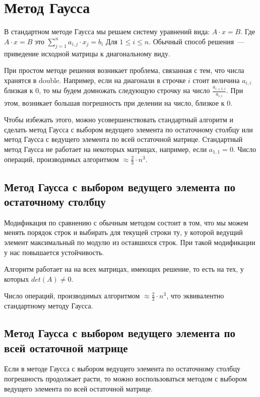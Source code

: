 \documentclass[../../report.tex]{subfiles}
\begin{document}


\chapter{Метод Гаусса}

В стандартном методе Гаусса мы решаем систему уравнений вида: $A \cdot x = B$.
Где $A \cdot x = B$ это
$\sum \limits_{j = 1}^{n} a_{i,j} \cdot x_j = b_i$ Для $1 \le i \le n$.
Обычный способ решения~--- приведение исходной матрицы к диагональному виду.

При простом методе решения возникает проблема, связанная с тем, что числа хранятся в double. Например, если на диагонали в строчке $i$ стоит величина $a_{i,i}$ близкая к $0$, то мы будем домножать следующую строчку на число $\frac{a_{i+1,i}}{a_{i,i}}$. При этом, возникает большая погрешность при делении на число, близкое к $0$.

Чтобы избежать этого, можно усовершенствовать стандартный алгоритм и сделать метод Гаусса с выбором ведущего элемента по остаточному столбцу или метод Гаусса с ведущего элемента по всей остаточной матрице.
Стандартный метод Гаусса не работает на некоторых матрицах, например, если $a_{1,1} = 0$.
Число операций, производимых алгоритмом $\approx \frac{2}{3} \cdot n^3$.

\section{Метод Гаусса с выбором ведущего элемента по остаточному столбцу}
Модификация по сравнению с обычным методом состоит в том, что мы можем менять порядок строк и выбирать для текущей строки ту, у которой ведущий элемент максимальный по модулю из оставшихся строк.
При такой модификации у нас повышается устойчивость.

Алгоритм работает на на всех матрицах, имеющих решение, то есть на тех, у которых $det(A) \neq 0$.

Число операций, производимых алгоритмом $\approx \frac{2}{3} \cdot n^3$, что эквивалентно стандартному методу Гаусса.

\section{Метод Гаусса с выбором ведущего элемента по всей остаточной матрице}
Если в методе Гаусса с выбором ведущего элемента по остаточному столбцу погрешность продолжает расти, то можно воспользоваться методом с выбором ведущего элемента по всей остаточной матрице.
\end{document}
